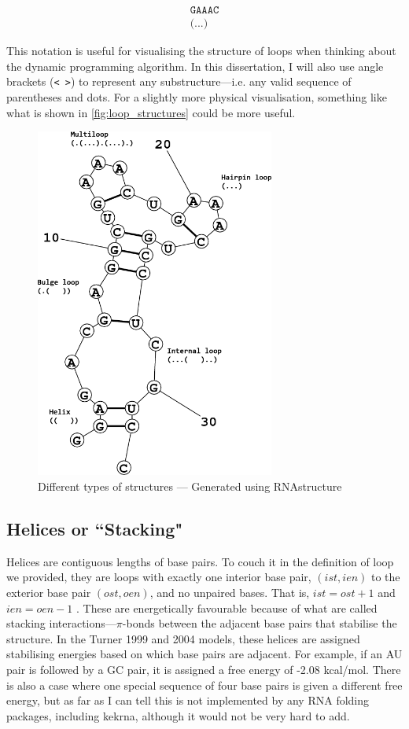 \documentclass{cshonours}
\begin{document}
\begin{align*}
\texttt{GAAAC} \\
\texttt{(...)}
\end{align*}

This notation is useful for visualising the structure of loops when thinking about the dynamic programming algorithm. In this dissertation, I will also use angle brackets (\texttt{<   >}) to represent any substructure---i.e. any valid sequence of parentheses and dots. For a slightly more physical visualisation, something like what is shown in \autoref{fig:loop_structures} could be more useful. 

\begin{figure}[H]
\center
\includegraphics[width=0.7\textwidth]{res/model.png}
\caption{Different types of structures --- Generated using RNAstructure \cite{rnastructure}}
\label{fig:loop_structures}
\end{figure}

\subsection{Helices or ``Stacking"}
Helices are contiguous lengths of base pairs. To couch it in the definition of loop we provided, they are loops with exactly one interior base pair, $(ist, ien)$ to the exterior base pair $(ost, oen)$, and no unpaired bases. That is, $ist = ost + 1$ and $ien = oen - 1$ \cite{zukerSankoff}. These are energetically favourable because of what are called stacking interactions---$\pi$-bonds between the adjacent base pairs that stabilise the structure. In the Turner 1999 and 2004 models, these helices are assigned stabilising energies based on which base pairs are adjacent. For example, if an AU pair is followed by a GC pair, it is assigned a free energy of -2.08 kcal/mol. There is also a case where one special sequence of four base pairs is given a different free energy, but as far as I can tell this is not implemented by any RNA folding packages, including kekrna, although it would not be very hard to add.
\end{document}
